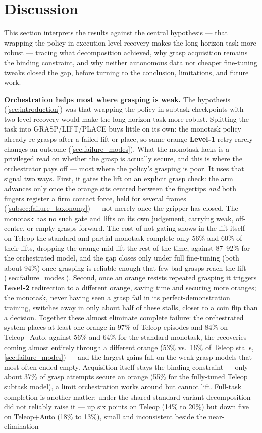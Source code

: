 \section{Discussion}
\label{sec:discussion}

This section interprets the results against the central hypothesis --- that wrapping the policy in execution-level recovery makes the long-horizon task more robust --- tracing what decomposition achieved, why grasp acquisition remains the binding constraint, and why neither autonomous data nor cheaper fine-tuning tweaks closed the gap, before turning to the conclusion, limitations, and future work.

\textbf{Orchestration helps most where grasping is weak.} The hypothesis (\cref{sec:introduction}) was that wrapping the policy in subtask checkpoints with two-level recovery would make the long-horizon task more robust. Splitting the task into GRASP/LIFT/PLACE buys little on its own: the monotask policy already re-grasps after a failed lift or place, so same-orange \textbf{Level-1} retry rarely changes an outcome (\cref{sec:failure_modes}). What the monotask lacks is a privileged read on whether the grasp is actually secure, and this is where the orchestrator pays off --- most where the policy's grasping is poor. It uses that signal two ways. First, it gates the lift on an explicit grasp check: the arm advances only once the orange sits centred between the fingertips \emph{and} both fingers register a firm contact force, held for several frames (\cref{subsec:failure_taxonomy}) --- not merely once the gripper has closed. The monotask has no such gate and lifts on its own judgement, carrying weak, off-centre, or empty grasps forward. The cost of not gating shows in the lift itself --- on Teleop the standard and partial monotask complete only 56\% and 60\% of their lifts, dropping the orange mid-lift the rest of the time, against 87--92\% for the orchestrated model, and the gap closes only under full fine-tuning (both about 94\%) once grasping is reliable enough that few bad grasps reach the lift (\cref{sec:failure_modes}). Second, once an orange resists repeated grasping it triggers \textbf{Level-2} redirection to a different orange, saving time and securing more oranges; the monotask, never having seen a grasp fail in its perfect-demonstration training, switches away in only about half of these stalls, closer to a coin flip than a decision. Together these almost eliminate complete failure: the orchestrated system places at least one orange in 97\% of Teleop episodes and 84\% on Teleop+Auto, against 56\% and 64\% for the standard monotask, the recoveries coming almost entirely through a different orange (53\% vs.\ 16\% of Teleop stalls, \cref{sec:failure_modes}) --- and the largest gains fall on the weak-grasp models that most often ended empty. Acquisition itself stays the binding constraint --- only about 37\% of grasp attempts secure an orange (55\% for the fully-tuned Teleop subtask model), a limit orchestration works around but cannot lift. Full-task completion is another matter: under the shared standard variant decomposition did not reliably raise it --- up six points on Teleop (14\% to 20\%) but down five on Teleop+Auto (18\% to 13\%), small and inconsistent beside the near-elimination 